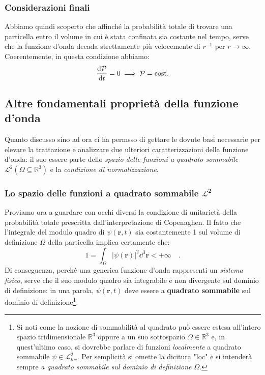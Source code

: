 \subsubsection{Considerazioni finali}
Abbiamo quindi scoperto che affinché la probabilità totale di trovare una particella entro il volume in cui è stata confinata sia costante nel tempo, serve che la funzione d'onda decada strettamente più velocemente di $r^{-1}$ per $r \to \infty$. Coerentemente, in questa condizione abbiamo: 
\[
    \dv{\mathcal{P}}{t} = 0 \implies \mathcal{P} = \text{cost.}
\] 

\subsection{Altre fondamentali proprietà della funzione d'onda}
Quanto discusso sino ad ora ci ha permsso di gettare le dovute basi necessarie per elevare la trattazione e analizzare due ulteriori caratterizzazioni della funzione d'onda: il suo essere parte dello \textit{spazio delle funzioni a quadrato sommabile} $\mathcal{L}^2(\Omega \subseteq \mathbb{R}^3)$ e la \textit{condizione di normalizzazione}.

\subsubsection{Lo spazio delle funzioni a quadrato sommabile $\bm{\mathcal{L}^2}$}
Proviamo ora a guardare con occhi diversi la condizione di unitarietà della probabilità totale prescritta dall'interpretazione di Copenaghen. Il fatto che l'integrale del modulo quadro di $\psi(\bm{r},t)$ sia costantemente 1 sul volume di definizione $\Omega$ della particella implica certamente che:
\[
    1 = \int_\Omega |\psi(\bm{r})|^2 \dd^3{\bm{r}} < +\infty \quad.
\]
Di conseguenza, perché una generica funzione d'onda rappresenti un \emph{sistema fisico}, serve che il suo modulo quadro sia integrabile e non divergente sul dominio di definizione: in una parola, $\psi(\bm{r},t)$ deve essere a \textbf{quadrato sommabile} sul dominio di definizione\footnote{Si noti come la nozione di sommabilità al quadrato può essere estesa all'intero spazio tridimensionale $\mathbb{R}^3$ oppure a un suo sottospazio $\Omega \in \mathbb{R}^3$ e, in quest'ultimo caso, si dovrebbe parlare di funzioni \emph{localmente} a quadrato sommabile $\psi \in \mathcal{L}^2_{loc}$. Per semplicità si omette la dicitura "{loc}" e si intenderà sempre \guillemetleft \emph{a quadrato sommabile sul dominio di definizione $\Omega$}\guillemetright.}. 

